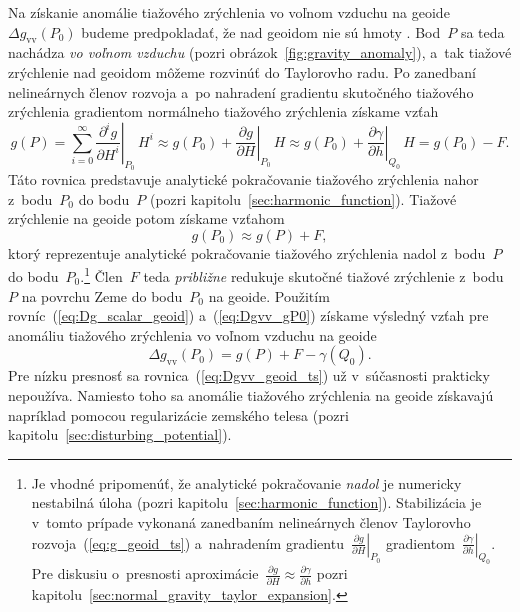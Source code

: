 \documentclass[a4paper, 12pt]{book}
\begin{document}
Na získanie anomálie tiažového zrýchlenia vo voľnom vzduchu na geoide~$\Delta 
g_{\mathrm{vv}}(P_0)$ budeme predpokladať, že nad geoidom nie sú hmoty 
\parencite{MoritzPhysicalGeodesy}.  Bod~$P$ sa teda nachádza \emph{vo voľnom 
vzduchu} (pozri obrázok~\ref{fig:gravity_anomaly}), a~tak tiažové zrýchlenie 
nad geoidom môžeme rozvinúť do Taylorovho radu.  Po zanedbaní nelineárnych 
členov rozvoja a~po nahradení gradientu skutočného tiažového zrýchlenia 
gradientom normálneho tiažového zrýchlenia získame vzťah
%
\begin{equation}
\label{eq:g_geoid_ts}
g(P) = \sum_{i = 0}^{\infty} \left.\frac{\partial^i g}{\partial 
H^i}\right|_{P_0} \, H^i \approx g(P_0) + \left.\frac{\partial g}{\partial 
H}\right|_{P_0} \, H \approx g(P_0) + \left.\frac{\partial \gamma}{\partial 
h}\right|_{Q_0} \, H = g(P_0) - F{.}
\end{equation}
%
Táto rovnica predstavuje analytické pokračovanie tiažového zrýchlenia nahor 
z~bodu~$P_0$ do bodu~$P$ (pozri kapitolu~\ref{sec:harmonic_function}).  Tiažové 
zrýchlenie na geoide potom získame vzťahom
%
\begin{equation}
\label{eq:Dgvv_gP0}
g(P_0) \approx g(P) + F{,}
\end{equation}
%
ktorý reprezentuje analytické pokračovanie tiažového zrýchlenia nadol 
z~bodu~$P$ do bodu~$P_0$.\footnote{\label{fn:Dgvv_P0_dc}Je vhodné pripomenúť, 
že analytické pokračovanie \emph{nadol} je numericky nestabilná úloha (pozri 
kapitolu~\ref{sec:harmonic_function}).  Stabilizácia je v~tomto prípade 
vykonaná zanedbaním nelineárnych členov Taylorovho 
rozvoja~(\ref{eq:g_geoid_ts}) a~nahradením gradientu~$\left.\frac{\partial 
g}{\partial H}\right|_{P_0}$ gradientom~$\left.\frac{\partial \gamma}{\partial 
h}\right|_{Q_0}$.  Pre diskusiu o~presnosti aproximácie~$\frac{\partial 
g}{\partial H} \approx \frac{\partial \gamma}{\partial h}$ pozri 
kapitolu~\ref{sec:normal_gravity_taylor_expansion}.}  Člen~$F$ teda 
\emph{približne} redukuje skutočné tiažové zrýchlenie z~bodu~$P$ na povrchu 
Zeme do bodu~$P_0$ na geoide.  Použitím rovníc~(\ref{eq:Dg_scalar_geoid}) 
a~(\ref{eq:Dgvv_gP0}) získame výsledný vzťah pre anomáliu tiažového zrýchlenia 
vo voľnom vzduchu na geoide
%
\begin{equation}
\label{eq:Dgvv_geoid_ts}
\Delta g_\mathrm{vv}(P_0) = g(P) + F - \gamma(Q_0){.}
\end{equation}
%
Pre nízku presnosť sa rovnica~(\ref{eq:Dgvv_geoid_ts}) už v~súčasnosti 
prakticky nepoužíva.  Namiesto toho sa anomálie tiažového zrýchlenia na geoide 
získavajú napríklad pomocou regularizácie zemského telesa (pozri 
kapitolu~\ref{sec:disturbing_potential}).
\end{document}
